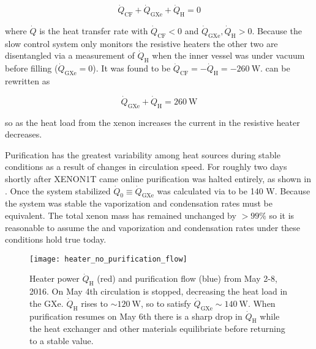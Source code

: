 \begin{equation}
\dot{Q}_{\mathrm{CF}} + \dot{Q}_{\mathrm{GXe}} + \dot{Q}_{\mathrm{H}} = 0
\label{eq:electron_lifetime_model_vap_and_cond_heat_cons}
\end{equation}

\noindent where $\dot{Q}$ is the heat transfer rate with $\dot{Q}_{\mathrm{CF}} < 0$ and
$\dot{Q}_{\mathrm{GXe}}, \dot{Q}_{\mathrm{H}} > 0$.  Because the slow control system only monitors the resistive heaters the
other two are disentangled via a measurement of $\dot{Q}_{\mathrm{H}}$ when the inner vessel was under vacuum before filling
($\dot{Q}_{\mathrm{GXe}} = 0$).  It was found
to be $\dot{Q}_{\mathrm{CF}} = -\dot{Q}_{\mathrm{H}} = -260\ \mathrm{W}$.   can
be rewritten as

\begin{equation}
\dot{Q}_{\mathrm{GXe}} + \dot{Q}_{\mathrm{H}} = 260\ \mathrm{W}
\label{eq:electron_lifetime_model_vap_and_cond_heat_gxe}
\end{equation}

\noindent so as the heat load from the xenon increases the current in the resistive heater decreases.

Purification has the greatest variability among heat sources during stable conditions as a result of changes in circulation speed.  For
roughly two days shortly after XENON1T came online purification was halted entirely, as shown in
.  Once the system stabilized $\dot{Q}_0 \equiv \dot{Q}_{\mathrm{GXe}}$ was
calculated via
 to be 140 W.  Because the system was stable the vaporization and condensation
rates must be equivalent.  The total xenon mass has remained unchanged by $> 99\%$ so it is reasonable to assume the \qdh and vaporization
and condensation rates under these conditions hold true today.

\begin{figure}
\centering
\texttt{[image: heater\_no\_purification\_flow]}
\caption{Heater power $\dot{Q}_{\mathrm{H}}$ (red) and purification flow (blue) from May 2-8, 2016.  On May 4th circulation is stopped,
decreasing the heat load in the GXe.  $\dot{Q}_{\mathrm{H}}$ rises to ${\sim}120\ \mathrm{W}$, so to satisfy
 $\dot{Q}_{\mathrm{GXe}} \sim 140\ \mathrm{W}$.  When purification resumes on
May 6th there is a sharp drop in $\dot{Q}_{\mathrm{H}}$ while the heat exchanger and other materials equilibriate before returning to a
stable value.}
\label{fig:electron_lifetime_model_vap_and_cond_no_flow}
\end{figure}

